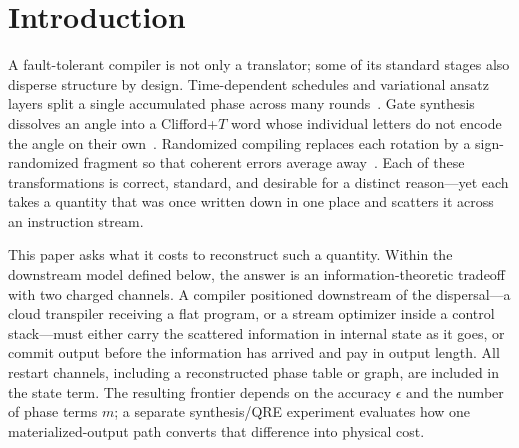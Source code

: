 \documentclass[a4paper,twocolumn,10pt,unpublished]{quantumarticle}
\begin{document}
\begin{abstract}
One downstream experiment fixes the physical stakes without promoting
them to a representation-independent theorem.  Under one disclosed
fixed-total-error Clifford+$T$ synthesis and surface-code model, a
materialize-first pipeline that retains separate rotations costs orders
of magnitude more logical $T$ states and spacetime volume than the
semantic-first pipeline; external tools that reconstruct the aggregate
before synthesis are classified on the semantic-capable side.  The
operational design rule is therefore to preserve scheduling and phase
semantics until aggregation whenever the downstream interface and
latency budget permit it.
\end{abstract}


\section{Introduction}
\label{sec:introduction}

A fault-tolerant compiler is not only a translator; some of its standard
stages also disperse structure by design.  Time-dependent schedules and
variational ansatz layers split a single
accumulated phase across many
rounds~\cite{farhi2014qaoa,peruzzo2014vqe,cerezo2021variational,childs2021trotter}.
Gate synthesis dissolves an angle
into a Clifford+$T$ word whose individual letters do not encode the angle
on their own~\cite{dawson2006solovay,kliuchnikov2013fast,selinger2015efficient,ross2016optimal}.
Randomized compiling replaces each rotation
by a sign-randomized fragment so that coherent errors average
away~\cite{wallman2016noise}.  Each of these transformations
is correct, standard, and desirable for a distinct
reason---yet each takes a quantity that was once written down in
one place and scatters it across an instruction stream.

This paper asks what it costs to reconstruct such a quantity.  Within
the downstream model defined below, the answer is an
information-theoretic tradeoff with two charged channels.  A
compiler positioned downstream of the dispersal---a cloud transpiler
receiving a flat program, or a stream optimizer inside a control
stack---must either carry the scattered information in internal state as
it goes, or commit output before the information has arrived and pay
in output length.  All restart channels, including a reconstructed
phase table or graph, are included in the state term.  The resulting
frontier depends on the accuracy $\epsilon$ and the number of phase
terms $m$; a separate synthesis/QRE experiment evaluates how one
materialized-output path converts that difference into physical cost.
\end{document}
